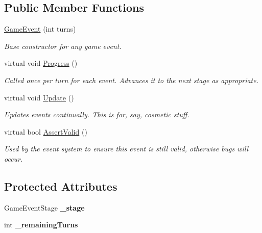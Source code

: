 \subsection*{Public Member Functions}
\begin{DoxyCompactItemize}
\item 
\hyperlink{class_game_event_a0cfd1ef30d8926f7e87d01a683a23cf0}{Game\+Event} (int turns)
\begin{DoxyCompactList}\small\item\em Base constructor for any game event. \end{DoxyCompactList}\item 
virtual void \hyperlink{class_game_event_af4e3b9e9da59c616f4136851b7a35130}{Progress} ()
\begin{DoxyCompactList}\small\item\em Called once per turn for each event. Advances it to the next stage as appropriate. \end{DoxyCompactList}\item 
virtual void \hyperlink{class_game_event_affc9765dad7ffeed5b68cd99027789ec}{Update} ()
\begin{DoxyCompactList}\small\item\em Updates events continually. This is for, say, cosmetic stuff. \end{DoxyCompactList}\item 
virtual bool \hyperlink{class_game_event_a39cda54b07ab8ad842f2fc4fec588a9f}{Assert\+Valid} ()
\begin{DoxyCompactList}\small\item\em Used by the event system to ensure this event is still valid, otherwise bugs will occur. \end{DoxyCompactList}\end{DoxyCompactItemize}
\subsection*{Protected Attributes}
\begin{DoxyCompactItemize}
\item 
\hypertarget{class_game_event_add7aa902c0daaf24b1a190ddb32d3ca1}{}Game\+Event\+Stage {\bfseries \+\_\+stage}\label{class_game_event_add7aa902c0daaf24b1a190ddb32d3ca1}

\item 
\hypertarget{class_game_event_a8466650a7c83a9b8a64436b0a06e18e8}{}int {\bfseries \+\_\+remaining\+Turns}\label{class_game_event_a8466650a7c83a9b8a64436b0a06e18e8}

\end{DoxyCompactItemize}
